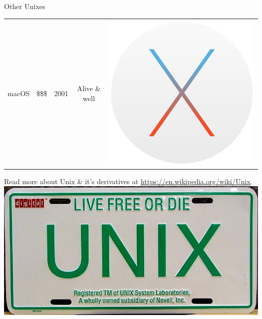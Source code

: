 \documentclass[graphics]{beamer}
\begin{document}
\begin{frame}{Other Unixes}
\begin{tabular}{c c c c c}
        macOS & \$\$\$ & 2001 & Alive \& well & \includegraphics[scale=0.12]{L03_OperatingSystems/L3_osx.jpg}
    \end{tabular}
    \vfill
    \footnotesize{Read more about Unix \& it's derivatives at \url{https://en.wikipedia.org/wiki/Unix}.} \\
    \hfill \includegraphics[scale=0.08]{L03_OperatingSystems/L3_unix_plate.jpg}
\end{frame}
\end{document}
